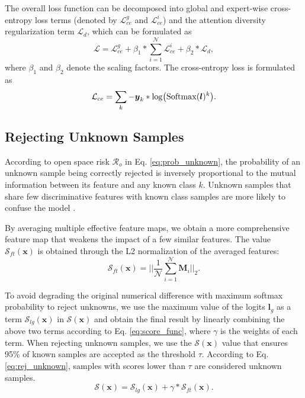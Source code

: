 \documentclass[letterpaper]{article} %
\begin{document}
The overall loss function can be decomposed into global and expert-wise cross-entropy loss terms (denoted by $\mathcal{L}_{ce}^g$ and $\mathcal{L}_{ce}^i$) and the attention diversity regularization term $\mathcal{L}_d$, which can be formulated as
\begin{equation}
\mathcal{L}=\mathcal{L}_{ce}^g+\beta_1*\sum_{i=1}^{\mathcal{N}}\mathcal{L}_{ce}^i+\beta_2*\mathcal{L}_d,
\label{eq:loss_full}
\end{equation}
where $\beta_1$ and $\beta_2$ denote the scaling factors. The cross-entropy loss is formulated as
\begin{equation}
\mathcal{L}_{ce}=\sum_k-\boldsymbol{y}_k*{\rm log}\big({\rm Softmax}(\boldsymbol{l})^k\big).
\label{eq:cross_perb}
\end{equation}

\subsection{Rejecting Unknown Samples}
According to open space risk $\mathcal{R}_o$ in Eq. \eqref{eq:prob_unknown}, the probability of an unknown sample being correctly rejected is inversely proportional to the mutual information between its feature and any known class $k$. Unknown samples that share few discriminative features with known class samples are more likely to confuse the model \cite{moon2022difficulty}.

By averaging multiple effective feature maps, we obtain a more comprehensive feature map that weakens the impact of a few similar features. The value $\mathcal{S}_{ft}(\boldsymbol{x})$ is obtained through the L2 normalization of the averaged features:
\begin{equation}
\mathcal{S}_{ft}(\boldsymbol{x})=\Big|\Big|\frac{1}{\mathcal{N}}{\sum_{i=1}^\mathcal{N}\boldsymbol{M}_i}\Big|\Big|_2.
\label{eq:score_ft}
\end{equation}

To avoid degrading the original numerical difference with maximum softmax probability to reject unknowns, 
we use the maximum value of the logits $\boldsymbol{l}_g$ as a term $\mathcal{S}_{lg}(\boldsymbol{x})$ in $\mathcal{S}(\boldsymbol{x})$ and obtain the final result by linearly combining the above two terms according to Eq. \eqref{eq:score_func}, where $\gamma$ is the weights of each term. When rejecting unknown samples, we use the $\mathcal{S}(\boldsymbol{x})$ value that ensures 95\% of known samples are accepted as the threshold $\tau$. According to Eq. \eqref{eq:rej_unknown}, samples with scores lower than $\tau$ are considered unknown samples.
\begin{equation}
\mathcal{S}(\boldsymbol{x})=\mathcal{S}_{lg}(\boldsymbol{x})+\gamma*\mathcal{S}_{ft}(\boldsymbol{x}).
\label{eq:score_func}
\end{equation}
\end{document}
